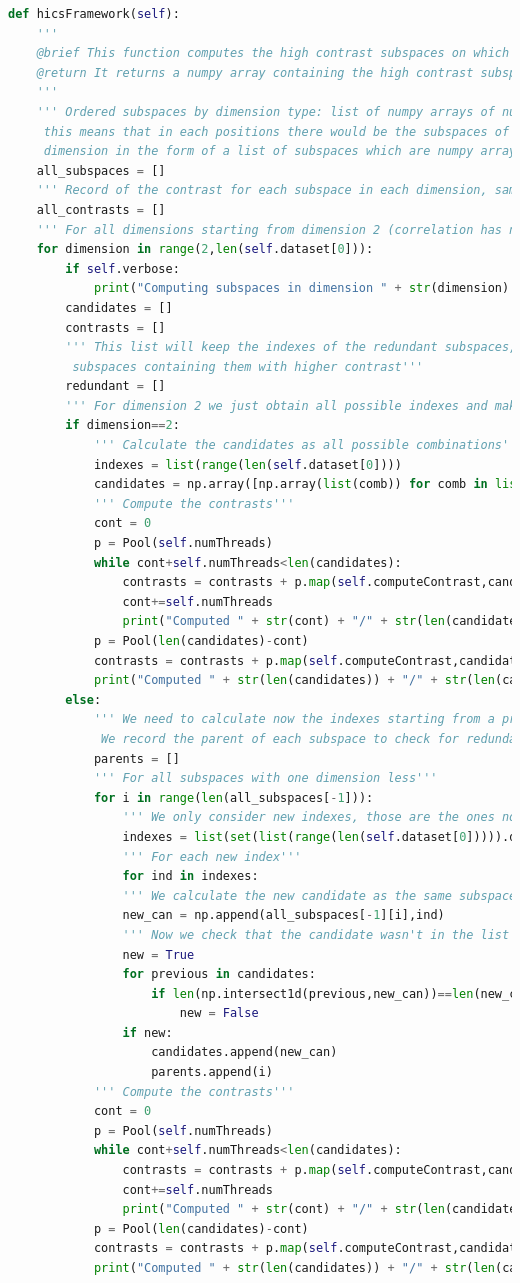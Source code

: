 \begin{lstlisting}[language=Python]
def hicsFramework(self):
	'''
	@brief This function computes the high contrast subspaces on which to score the outlier
	@return It returns a numpy array containing the high contrast subspaces
	'''
	''' Ordered subspaces by dimension type: list of numpy arrays of numpy arrays
	 this means that in each positions there would be the subspaces of the corresponding
	 dimension in the form of a list of subspaces which are numpy arrays'''
	all_subspaces = []
	''' Record of the contrast for each subspace in each dimension, same shape as all_subspaces'''
	all_contrasts = []
	''' For all dimensions starting from dimension 2 (correlation has no sense on dimension 1)'''
	for dimension in range(2,len(self.dataset[0])):
		if self.verbose:
			print("Computing subspaces in dimension " + str(dimension) + "/" + str(len(self.dataset[0])))
		candidates = []
		contrasts = []
		''' This list will keep the indexes of the redundant subspaces, those are d-dimensional subspaces with d+1-dimensional
		 subspaces containing them with higher contrast'''
		redundant = []
		''' For dimension 2 we just obtain all possible indexes and make all combinations'''
		if dimension==2:
			''' Calculate the candidates as all possible combinations'''
			indexes = list(range(len(self.dataset[0])))
			candidates = np.array([np.array(list(comb)) for comb in list(combinations(indexes,dimension))])
			''' Compute the contrasts'''
			cont = 0
			p = Pool(self.numThreads)
			while cont+self.numThreads<len(candidates):
				contrasts = contrasts + p.map(self.computeContrast,candidates[cont:cont+self.numThreads])
				cont+=self.numThreads
				print("Computed " + str(cont) + "/" + str(len(candidates)))
			p = Pool(len(candidates)-cont)
			contrasts = contrasts + p.map(self.computeContrast,candidates[cont:])
			print("Computed " + str(len(candidates)) + "/" + str(len(candidates)))
		else:
			''' We need to calculate now the indexes starting from a previous subspace
			 We record the parent of each subspace to check for redundancy'''
			parents = []
			''' For all subspaces with one dimension less'''
			for i in range(len(all_subspaces[-1])):
				''' We only consider new indexes, those are the ones not uses in the father subspace'''
				indexes = list(set(list(range(len(self.dataset[0])))).difference(set(all_subspaces[-1][i])))
				''' For each new index'''
				for ind in indexes:
				''' We calculate the new candidate as the same subspace appending the index'''
				new_can = np.append(all_subspaces[-1][i],ind)
				''' Now we check that the candidate wasn't in the list before'''
				new = True
				for previous in candidates:
					if len(np.intersect1d(previous,new_can))==len(new_can):
						new = False
				if new:
					candidates.append(new_can)
					parents.append(i)
			''' Compute the contrasts'''
			cont = 0
			p = Pool(self.numThreads)
			while cont+self.numThreads<len(candidates):
				contrasts = contrasts + p.map(self.computeContrast,candidates[cont:cont+self.numThreads])
				cont+=self.numThreads
				print("Computed " + str(cont) + "/" + str(len(candidates)))
			p = Pool(len(candidates)-cont)
			contrasts = contrasts + p.map(self.computeContrast,candidates[cont:])
			print("Computed " + str(len(candidates)) + "/" + str(len(candidates)))
			

\end{lstlisting}
